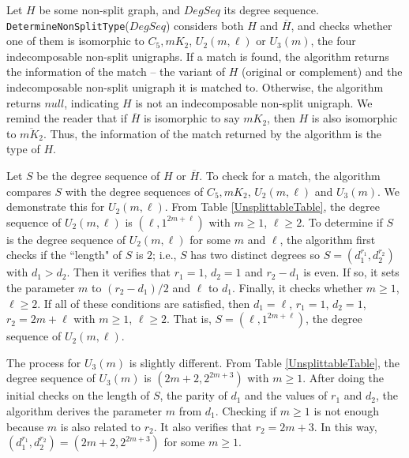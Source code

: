 \documentclass[11pt]{article}
\begin{document}
 Let $H$ be some non-split  graph, and $\mathit{DegSeq}$ its degree sequence.  %
 {\tt DetermineNonSplitType}($\mathit{DegSeq}$)  considers both $H$ and $\overline{H}$, and checks whether one of them is isomorphic to $C_5, mK_2$, $U_2(m, \ell)$ or $U_3(m)$,  the four indecomposable non-split unigraphs.  If a match is found,  the algorithm returns the information of the match -- the variant of $H$ (original or complement) and the indecomposable non-split unigraph it is matched to.
  Otherwise, the algorithm returns $null$,  indicating $H$ is not an indecomposable non-split unigraph.   We remind the reader that if $\overline{H}$ is isomorphic to say $mK_2$, then $H$ is also isomorphic to $\overline{mK_2}$.  Thus, the information of the match returned by the algorithm is the type of $H$.  
 
 
  Let $S$ be the degree sequence of $H$ or $\overline{H}$.  To check for a match,  the algorithm compares $S$ with the degree sequences of $C_5, mK_2$, $U_2(m, \ell)$ and $U_3(m)$.  We demonstrate this for $U_2(m, \ell)$.
 From Table \ref{UnsplittableTable}, the degree sequence of $U_2(m, \ell)$ is $(\ell, 1^{2m+\ell})$ with $m \ge 1$, $\ell \ge 2$.  To determine if $S$ is the degree sequence of $U_2(m, \ell)$ for some $m$ and $\ell$, the algorithm first checks if the ``length" of $S$ is $2$; i.e., $S$ has two distinct degrees so $S = (d_1^{r_1}, d_2^{r_2})$ with $d_1 > d_2$. 
 Then it verifies that $r_1 = 1$, $d_2 = 1$ and $r_2 - d_1$ is even.  If so, it sets the parameter $m$ to $(r_2 - d_1)/2$ and $\ell$ to $d_1$.   Finally, it checks whether $m \ge 1$, $\ell \ge 2$.   If all of these conditions are satisfied, then $d_1 = \ell$, $r_1 = 1$, $d_2 = 1$,  $r_2 = 2m + \ell$ with $m \ge 1$, $\ell \ge 2$.  That is, $S = (\ell, 1^{2m+\ell})$,  the degree sequence of $U_2(m, \ell)$.  
 
 The process for $U_3(m)$ is slightly different.  From Table \ref{UnsplittableTable}, the degree sequence of $U_3(m)$ is $(2m+2, 2^{2m+3})$ with $m \ge 1$.  After doing the initial checks on the length of $S$, the parity of $d_1$ and the values of $r_1$ and $d_2$, the algorithm derives the parameter $m$ from $d_1$. Checking if $m \ge 1$  is not enough because $m$ is also related to $r_2$.  It also verifies that $r_2 = 2m+3$.  In this way, $(d_1^{r_1}, d_2^{r_2}) = (2m+2, 2^{2m+3})$ for some $m \ge 1$. 
 
\end{document}

